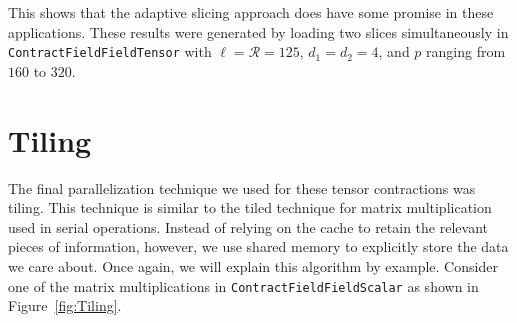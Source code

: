 This shows that the adaptive slicing approach does have some promise in these applications. These results were generated by loading two slices simultaneously in \texttt{ContractFieldFieldTensor} with $\ell = \mathcal{R} = 125$, $d_1 = d_2 = 4$, and $p$ ranging from $160$ to $320$.

\section{Tiling}\label{sec:tiling}

The final parallelization technique we used for these tensor contractions was
tiling. This technique is similar to the tiled technique for matrix
multiplication used in serial operations. Instead of relying on the cache to
retain the relevant pieces of information, however, we use shared memory to
explicitly store the data we care about. Once again, we will explain this
algorithm by example. Consider one of the matrix multiplications in
\texttt{ContractFieldFieldScalar} as shown in Figure~\ref{fig:Tiling}. 



